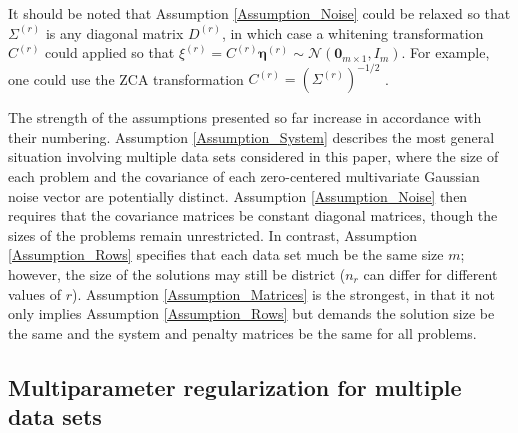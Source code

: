 \documentclass[12pt]{article}
\newcommand{\mA}{m}	%
\newcommand{\noise}{\eta}	%
\newcommand{\noiseVec}{\bm{\noise}}	%
\newcommand{\zeroVec}{\bm{0}}	%
\begin{document}
\noindent It should be noted that Assumption \ref{Assumption_Noise} could be relaxed so that $\Sigma^{(r)}$ is any diagonal matrix $D^{(r)}$, in which case a whitening transformation $C^{(r)}$ could applied so that $\xi^{(r)} = C^{(r)}\noiseVec^{(r)} \sim \mathcal{N}(\zeroVec_{\mA \times 1},I_{\mA})$. For example, one could use the ZCA transformation $C^{(r)} = \left(\Sigma^{(r)}\right)^{-1/2}$ \cite{BellSejnowski}. \par
The strength of the assumptions presented so far increase in accordance with their numbering. Assumption \ref{Assumption_System} describes the most general situation involving multiple data sets considered in this paper, where the size of each problem and the covariance of each zero-centered multivariate Gaussian noise vector are potentially distinct. Assumption \ref{Assumption_Noise} then requires that the covariance matrices be constant diagonal matrices, though the sizes of the problems remain unrestricted. In contrast, Assumption \ref{Assumption_Rows} specifies that each data set much be the same size $m$; however, the size of the solutions may still be district ($n_r$ can differ for different values of $r$). Assumption \ref{Assumption_Matrices} is the strongest, in that it not only implies Assumption \ref{Assumption_Rows} but demands the solution size be the same and the system and penalty matrices be the same for all problems.

\subsection{Multiparameter regularization for multiple data sets} \label{sec:Adapted regularization}
\end{document}
